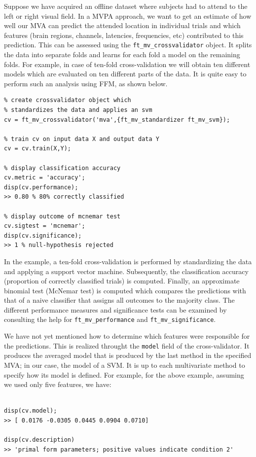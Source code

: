 \documentclass{article}
\renewcommand{\t}[1]{{\tt #1}}
\begin{document}
Suppose we have acquired an offline dataset where subjects had to attend to the left or right visual field. In a MVPA approach, we want to get an estimate of how well our MVA can predict the attended location in individual trials and which features (brain regions, channels, latencies, frequencies, etc) contributed to this prediction. This can be assessed using the \t{ft\_mv\_crossvalidator} object. It splits the data into separate folds and learns for each fold a model on the remaining folds. For example, in case of ten-fold cross-validation we will obtain ten different models which are evaluated on ten different parts of the data. It is quite easy to perform such an analysis using FFM, as shown below.
\begin{verbatim}
% create crossvalidator object which 
% standardizes the data and applies an svm
cv = ft_mv_crossvalidator('mva',{ft_mv_standardizer ft_mv_svm});

% train cv on input data X and output data Y
cv = cv.train(X,Y);

% display classification accuracy
cv.metric = 'accuracy';
disp(cv.performance);
>> 0.80 % 80% correctly classified

% display outcome of mcnemar test
cv.sigtest = 'mcnemar';
disp(cv.significance);
>> 1 % null-hypothesis rejected
\end{verbatim}
In the example, a ten-fold cross-validation is performed by standardizing the data and applying a support vector machine. Subsequently, the classification accuracy (proportion of correctly classified trials) is computed. Finally, an approximate binomial test (McNemar test) is computed which compares the predictions with that of a naive classifier that assigns all outcomes to the majority class. The different performance measures and significance tests can be examined by consulting the help for \t{ft\_mv\_performance} and \t{ft\_mv\_significance}.

We have not yet mentioned how to determine which features were responsible for the predictions. This is realized throught the \t{model} field of the cross-validator. It produces the averaged model that is produced by the last method in the specified MVA; in our case, the model of a SVM. It is up to each multivariate method to  specify how its model is defined. For example, for the above example, assuming we used only five features, we have:
\begin{verbatim}

disp(cv.model);
>> [ 0.0176 -0.0305 0.0445 0.0904 0.0710]

disp(cv.description)
>> 'primal form parameters; positive values indicate condition 2'

\end{verbatim}
\end{document}
